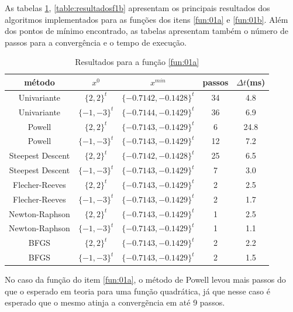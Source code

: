 \documentclass[10pt, a4paper]{article}
\begin{document}
As tabelas \ref{table:resultadosf1a}, \ref{table:resultadosf1b} apresentam os principais resultados dos algoritmos implementados para as fun\c c\~oes dos itens \ref{fun:01a} e \ref{fun:01b}. Al\'em dos pontos de m\'inimo encontrado, as tabelas apresentam tamb\'em o n\'umero de passos para a converg\^encia e o tempo de execu\c c\~ao.

\begin{table}[H]
      \small
      \centering
      \caption{Resultados para a fun\c c\~ao \ref{fun:01a}}
      \begin{tabular}{c|c|c|c|c}
            m\'etodo           & $x^0$ & $x^{min}$ & passos & $\Delta t$(ms) \\
            \hline
            Univariante         & $\{2,2\}^t$     & $\{-0.7142,-0.1428\}^t$  & 34 & 4.8 \\
            Univariante         & $\{-1,-3\}^t$   & $\{-0.7144,-0.1429\}^t$  & 36 & 6.9 \\
            \hline
            Powell              & $\{2,2\}^t$     & $\{-0.7143,-0.1429\}^t$  &  6 & 24.8 \\
            Powell              & $\{-1,-3\}^t$   & $\{-0.7143,-0.1429\}^t$  & 12 & 7.2 \\
            \hline
            Steepest Descent    & $\{2,2\}^t$     & $\{-0.7142,-0.1428\}^t$  & 25 & 6.5 \\
            Steepest Descent    & $\{-1,-3\}^t$   & $\{-0.7143,-0.1429\}^t$  &  7 & 3.0 \\
            \hline
            Flecher-Reeves     & $\{2,2\}^t$     & $\{-0.7143,-0.1429\}^t$  &  2 & 2.5 \\
            Flecher-Reeves     & $\{-1,-3\}^t$   & $\{-0.7143,-0.1429\}^t$  &  2 & 1.7 \\
            \hline
            Newton-Raphson     & $\{2,2\}^t$     & $\{-0.7143,-0.1429\}^t$  &  1 & 2.5 \\
            Newton-Raphson     & $\{-1,-3\}^t$   & $\{-0.7143,-0.1429\}^t$  &  1 & 1.1 \\
            \hline
            BFGS                & $\{2,2\}^t$     & $\{-0.7143,-0.1429\}^t$  &  2 & 2.2 \\
            BFGS                & $\{-1,-3\}^t$   & $\{-0.7143,-0.1429\}^t$  &  2 & 1.5 \\
      \end{tabular}
      \label{table:resultadosf1a}
\end{table}

No caso da fun\c c\~ao do item \ref{fun:01a}, o m\'etodo de Powell levou mais passos do que o esperado em teoria para uma fun\c c\~ao quadr\'atica, j\'a que nesse caso \'e esperado que o mesmo atinja a converg\~encia em at\'e 9 passos.
\end{document}

